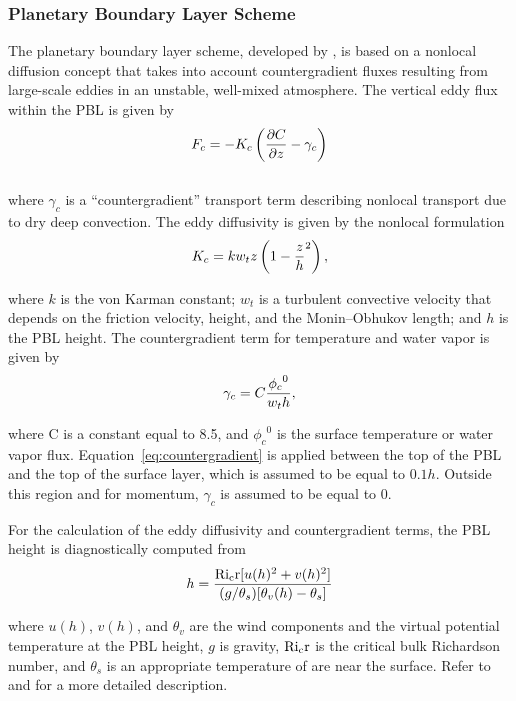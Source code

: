 \subsubsection{Planetary Boundary Layer Scheme} \noindent The planetary boundary
layer scheme, developed by \cite{Holtslag_90}, is based on a nonlocal diffusion
concept that takes into account countergradient fluxes resulting from
large-scale eddies in an unstable, well-mixed atmosphere.  The vertical eddy
flux within the PBL is given by \\ \begin{eqnarray} F_c = -K_c \left(
{\partial{C} \over \partial{z}} - \gamma_c \right) \end{eqnarray} \\

\noindent where $\gamma_c$ is a ``countergradient'' transport term describing
nonlocal transport due to dry deep convection.  The eddy diffusivity is given by
the nonlocal formulation \\ \begin{eqnarray} K_c = kw_tz \left( 1- {z \over h}^2
\right), \end{eqnarray}

\noindent where $k$ is the von Karman constant; $w_t$ is a turbulent convective
velocity that depends on the friction velocity, height, and the Monin--Obhukov
length;  and $h$ is the PBL height.  The countergradient term for temperature
and water vapor is given by \\ \begin{eqnarray}  \label{eq:countergradient}
\gamma_c = C { {\phi_c}^0 \over w_t h}, \end{eqnarray}

\noindent where C is a constant equal to 8.5, and ${\phi_c}^0$ is the surface
temperature or water vapor flux. Equation~\ref{eq:countergradient} is applied
between the top of the PBL and the top of the surface layer, which is assumed to
be equal to $0.1h$. Outside this region and for momentum, $\gamma_c$ is assumed
to be equal to 0.  

For the calculation of the eddy diffusivity and countergradient terms, the PBL
height is diagnostically computed from \\ \begin{eqnarray} h = { {\rm Ri_cr}
[u(h)^2 + v(h)^2] \over (g/\theta_s)[\theta_v(h)-\theta_s] } \end{eqnarray}

\noindent where $u(h)$, $v(h)$, and $\theta_v$ are the wind components and the
virtual potential temperature at the PBL height, $g$ is gravity, ${\rm Ri_cr}$
is the critical bulk Richardson number, and $\theta_s$ is an appropriate
temperature of are near the surface.  Refer to \cite{Holtslag_90} and
\cite{Holtslag_93} for a more detailed description.


